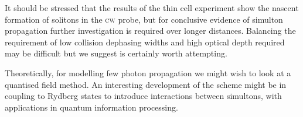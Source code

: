   It should be stressed that the results of the thin cell experiment show the
  nascent formation of solitons in the \textsc{cw} probe, but for conclusive
  evidence of simulton propagation further investigation is required over longer
  distances. Balancing the requirement of low collision dephasing widths and
  high optical depth required may be difficult but we suggest is certainly worth
  attempting.

  Theoretically, for modelling few photon propagation we might wish to look at a
  quantised field method. An interesting development of the scheme might be in
  coupling to Rydberg states to introduce interactions between simultons, with
  applications in quantum information
  processing.\cite{Maxwell2013,Saffman2010,Maghrebi2015}

